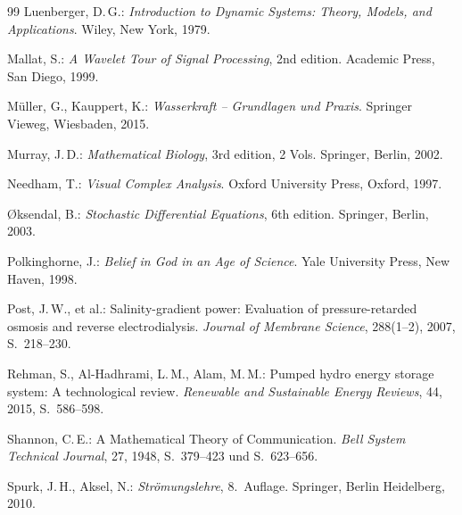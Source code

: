 ﻿\documentclass[a4paper,12pt]{article}
\theoremstyle{definition}
\begin{document}
\begin{thebibliography}{99}
Luenberger, D.\,G.:
\textit{Introduction to Dynamic Systems: Theory, Models, and Applications}.
Wiley, New York, 1979.

Mallat, S.:
\textit{A Wavelet Tour of Signal Processing}, 2nd edition.
Academic Press, San Diego, 1999.

M\"uller, G., Kauppert, K.:
\textit{Wasserkraft -- Grundlagen und Praxis}.
Springer Vieweg, Wiesbaden, 2015.

Murray, J.\,D.:
\textit{Mathematical Biology}, 3rd edition, 2 Vols.
Springer, Berlin, 2002.

Needham, T.:
\textit{Visual Complex Analysis}.
Oxford University Press, Oxford, 1997.

{\O}ksendal, B.:
\textit{Stochastic Differential Equations}, 6th edition.
Springer, Berlin, 2003.

Polkinghorne, J.:
\textit{Belief in God in an Age of Science}.
Yale University Press, New Haven, 1998.

Post, J.\,W., et al.:
Salinity-gradient power: Evaluation of pressure-retarded osmosis and reverse electrodialysis.
\textit{Journal of Membrane Science}, 288(1--2), 2007, S.~218--230.

Rehman, S., Al-Hadhrami, L.\,M., Alam, M.\,M.:
Pumped hydro energy storage system: A technological review.
\textit{Renewable and Sustainable Energy Reviews}, 44, 2015, S.~586--598.

Shannon, C.\,E.:
A Mathematical Theory of Communication.
\textit{Bell System Technical Journal}, 27, 1948, S.~379--423 und S.~623--656.

Spurk, J.\,H., Aksel, N.:
\textit{Str\"omungslehre}, 8.~Auflage.
Springer, Berlin Heidelberg, 2010.

\end{thebibliography}
\end{document}
